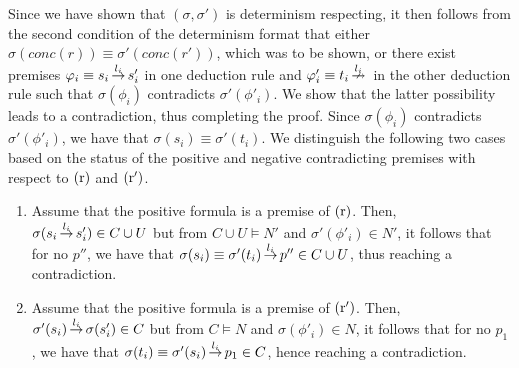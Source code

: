 Since we have shown that $(\sigma, \sigma')$ is determinism respecting,
it then follows from the second condition of the determinism format that either $\sigma(conc(r)) \equiv \sigma'(conc(r'))$,
which was to be shown, or
there exist premises $\varphi_i \equiv s_i \,{\stackrel{{l_i}}{\rightarrow}}\, s'_i$  in one deduction rule and
$\varphi'_i \equiv t_i \,{\stackrel{{l_i}}{\nrightarrow}}\,$ in the other deduction rule such that
$\sigma(\phi_i)$ contradicts $\sigma'(\phi'_i)$.
We show that the latter possibility leads to a contradiction, thus completing the proof.
Since $\sigma(\phi_i)$ contradicts $\sigma'(\phi'_i)$, we have that $\sigma(s_i) \equiv \sigma'(t_i)$.
We distinguish the following two cases based on the status of the positive and negative contradicting premises with respect to $\mathrm{(r)}$ and $\mathrm{(r')}$.

\begin{enumerate}
\item
Assume that the positive formula is a premise of $\mathrm{(r)}$.
Then, $\sigma(s_i \,{\stackrel{{l_i}}{\rightarrow}}\, s'_i) \in C \cup U$ but  from $C \cup U \vDash N'$ and $\sigma'(\phi'_i) \in N'$, it follows that
for no $p''$, we have that $\sigma(s_i) \equiv \sigma'(t_i) \,{\stackrel{{l_i}}{\rightarrow}}\, p'' \in C \cup U$, thus reaching a contradiction.

\item
Assume that the positive formula is a premise of $\mathrm{(r')}$.
Then, $\sigma'(s_i) \,{\stackrel{{l_i}}{\rightarrow}}\, \sigma(s'_i) \in C$ but from $C \vDash N$ and $\sigma(\phi'_i) \in N$, it follows that
for no $p_1$, we have that $\sigma(t_i) \equiv \sigma'(s_i) \,{\stackrel{{l_i}}{\rightarrow}}\, p_1 \in C$, hence reaching a contradiction. \qedhere
\end{enumerate}